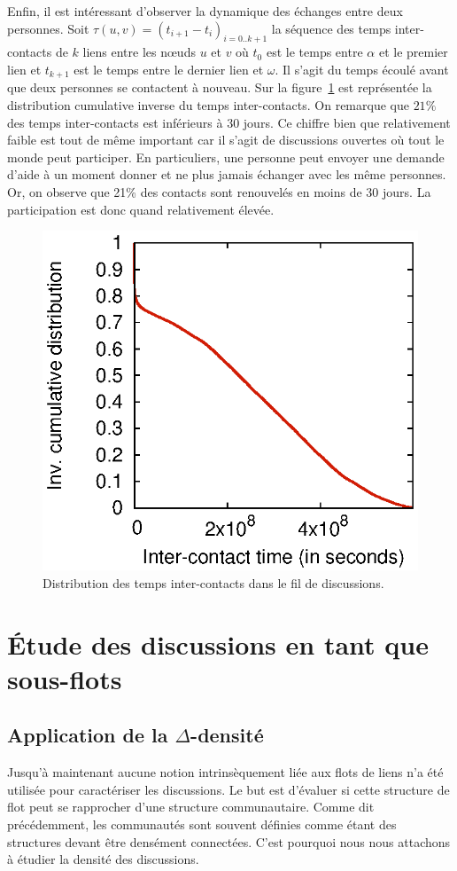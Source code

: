 Enfin, il est intéressant d'observer la dynamique des échanges entre deux personnes.
Soit $\tau(u,v) = (t_{i+1}-t_i)_{i=0..k+1}$ la séquence des temps inter-contacts de $k$ liens entre les n\oe uds $u$ et $v$ où $t_0$ est le temps entre $\alpha$ et le premier lien et $t_{k+1}$ est le temps entre le dernier lien et $\omega$.
Il s'agit du temps écoulé avant que deux personnes se contactent à nouveau.
Sur la figure~\ref{fig:ict_discussion} est représentée la distribution cumulative inverse du temps inter-contacts. 
On remarque que $21\%$ des temps inter-contacts est inférieurs à 30 jours.
Ce chiffre bien que relativement faible est tout de même important car il s'agit de discussions ouvertes où tout le monde peut participer. 
En particuliers, une personne peut envoyer une demande d'aide à un moment donner et ne plus jamais échanger avec les même personnes.
Or, on observe que 21\% des contacts sont renouvelés en moins de 30 jours.
La participation est donc quand relativement élevée.
\begin{figure}
	\centering
	\includegraphics[width=0.49\linewidth]{img/mailing/ict-ccdf.eps}
	\caption{Distribution des temps inter-contacts dans le fil de discussions.}
	\label{fig:ict_discussion}
\end{figure}

\section{\'Etude des discussions en tant que sous-flots}
\subsection{Application de la $\Delta$-densité}

Jusqu'à maintenant aucune notion intrinsèquement liée aux flots de liens n'a été utilisée pour caractériser les discussions.
Le but est d'évaluer si cette structure de flot peut se rapprocher d'une structure communautaire.
Comme dit précédemment, les communautés sont souvent définies comme étant des structures devant être densément connectées.
C'est pourquoi nous nous attachons à étudier la densité des discussions.

